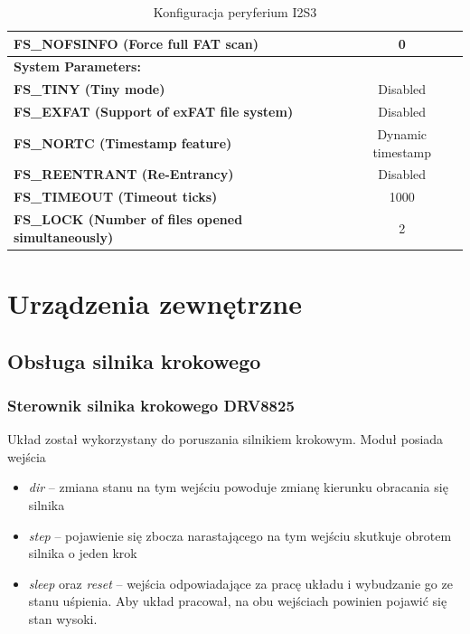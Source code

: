 \documentclass[10pt, a4paper]{article}
\begin{document}
\begin{table}[H]
\begin{tabular}{|l|c|}
\hline  \textbf{FS{\_}NOFSINFO (Force full FAT scan)} &  0\\
\hline  \textbf{System Parameters:} \\
\hline  \textbf{FS{\_}TINY (Tiny mode) } & Disabled\\
\hline  \textbf{FS{\_}EXFAT (Support of exFAT file system)} &  Disabled\\
\hline  \textbf{FS{\_}NORTC (Timestamp feature)} &  Dynamic timestamp\\
\hline  \textbf{FS{\_}REENTRANT (Re-Entrancy)} &  Disabled\\
\hline  \textbf{FS{\_}TIMEOUT (Timeout ticks) } & 1000\\
\hline  \textbf{FS{\_}LOCK (Number of files opened simultaneously)} &  2\\

	
	\hline

	\end{tabular}
	\caption{Konfiguracja peryferium I2S3}
	\label{tab:USART}
\end{table}
\newpage


\section{Urządzenia zewnętrzne}


\subsection{Obsługa silnika krokowego}
\subsubsection{Sterownik silnika krokowego DRV8825}
Układ został wykorzystany do poruszania silnikiem krokowym. Moduł posiada wejścia
\begin{itemize}
    \item \emph{dir} -- zmiana stanu na tym wejściu powoduje zmianę kierunku obracania się silnika
    \item \emph{step} -- pojawienie się zbocza narastającego na tym wejściu skutkuje obrotem silnika o jeden krok
    \item \emph{sleep} oraz \emph{reset} -- wejścia odpowiadające za pracę układu i wybudzanie go ze stanu uśpienia. Aby układ pracował, na obu wejściach powinien pojawić się stan wysoki.
\end{itemize}
\end{document}
